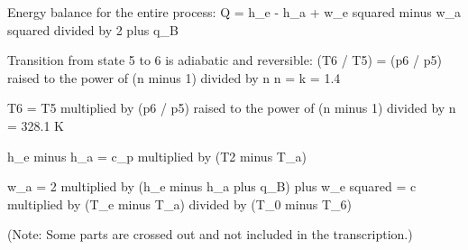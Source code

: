 Energy balance for the entire process:  
Q = h_e - h_a + w_e squared minus w_a squared divided by 2 plus q_B  

Transition from state 5 to 6 is adiabatic and reversible:  
(T6 / T5) = (p6 / p5) raised to the power of (n minus 1) divided by n  
n = k = 1.4  

T6 = T5 multiplied by (p6 / p5) raised to the power of (n minus 1) divided by n = 328.1 K  

h_e minus h_a = c_p multiplied by (T2 minus T_a)  

w_a = 2 multiplied by (h_e minus h_a plus q_B) plus w_e squared =  
c multiplied by (T_e minus T_a) divided by (T_0 minus T_6)  

(Note: Some parts are crossed out and not included in the transcription.)